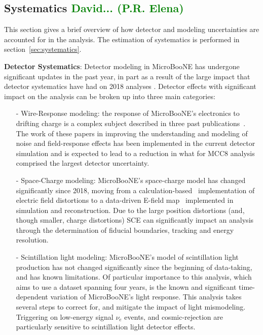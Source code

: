 \documentclass[a4paper]{article}
\begin{document}
\subsection{Systematics \textcolor{green}{David... (P.R. Elena)}}
\par This section gives a brief overview of how detector and modeling uncertainties are accounted for in the analysis. The estimation of systematics is performed in section~\ref{sec:systematics}.
\par \noindent \textbf{Detector Systematics}: Detector modeling in MicroBooNE has undergone significant updates in the past year, in part as a result of the large impact that detector systematics have had on 2018 analyses \cite{bib:CCpi0, bib:CCincl}. Detector effects with significant impact on the analysis can be broken up into three main categories:
\begin{itemize}
    \item[-] Wire-Response modeling: the response of MicroBooNE's electronics to drifting charge is a complex subject described in three past publications~\cite{bib:noise,bib:SP1,bib:SP2}. The work of these papers in improving the understanding and modeling of noise and field-response effects has been implemented in the current detector simulation and is expected to lead to a reduction in what for MCC8 analysis comprised the largest detector uncertainty.
    \item[-] Space-Charge modeling: MicroBooNE's space-charge model has changed significantly since 2018, moving from a calculation-based~\cite{bib:SCEsim} implementation of electric field distortions to a data-driven E-field map~\cite{bib:SCEdata} implemented in simulation and reconstruction. Due to the large position distortions (and, though smaller, charge distortions) SCE can significantly impact an analysis through the determination  of fiducial boundaries, tracking and energy resolution.
    \item[-] Scintillation light modeling: MicroBooNE's model of scintillation light production has not changed significantly since the beginning of data-taking, and has known limitations. Of particular importance to this analysis, which aims to use a dataset spanning four years, is the known and significant time-dependent variation of MicroBooNE's light response. This analysis takes several steps to correct for, and mitigate the impact of light mismodeling. Triggering on low-energy signal $\nu_e$ events, and cosmic-rejection are particularly sensitive to scintillation light detector effects.
\end{itemize}
\end{document}
